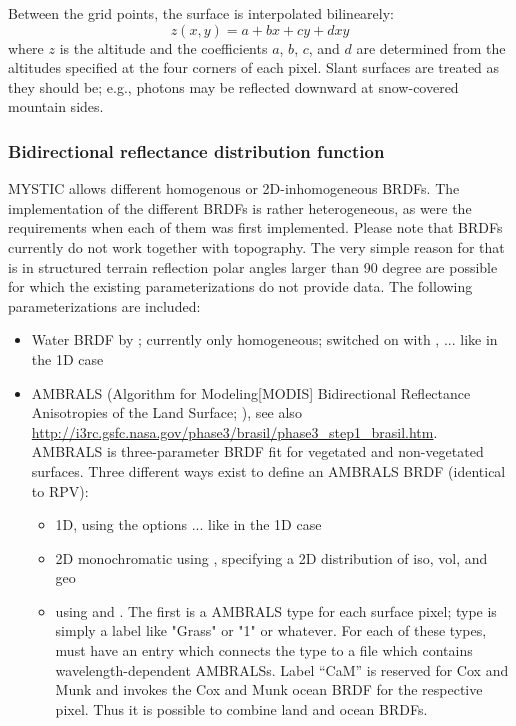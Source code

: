 {Between the grid points, the surface is interpolated 
bilinearely: 
\begin{equation}
  z(x,y) = a + bx + cy + dxy
\end{equation}
where $z$ is the altitude and the coefficients $a$, $b$, $c$, and $d$
are determined from 
the altitudes specified at the four corners of each pixel.
Slant surfaces are treated as they should be; e.g., photons
may be reflected downward at snow-covered mountain sides.

\subsubsection{Bidirectional reflectance distribution function}
MYSTIC allows different homogenous or 2D-inhomogeneous BRDFs. The 
implementation of the different BRDFs is rather heterogeneous,   
as were the requirements when each of them was first implemented.
Please note that BRDFs currently do not work together with topography. The 
very simple reason for that is in structured terrain reflection 
polar angles larger than 90 degree are possible for which the 
existing parameterizations do not provide data. The following  
parameterizations are included:
\begin{itemize}
\item Water BRDF by \citet{cox54a,cox54b}; currently only homogeneous; switched 
  on with , ... like in the 1D case
\item AMBRALS (Algorithm for Modeling[MODIS] Bidirectional Reflectance
  Anisotropies of the Land Surface; \citet{wanner97}), see also
  \url{http://i3rc.gsfc.nasa.gov/phase3/brasil/phase3_step1_brasil.htm}.
  AMBRALS is three-parameter BRDF fit for vegetated and non-vegetated surfaces.
Three different ways exist to define an AMBRALS BRDF (identical to RPV):
  \begin{itemize}
  \item 1D, using the options  ... like in the 1D case
  \item 2D monochromatic using , specifying a
    2D distribution of iso, vol, and geo
  \item using  and .
    The first is a AMBRALS
    type for each surface pixel; type is simply a label like 
    "Grass" or "1" or whatever. For each of these types,
     must have an entry which connects the type to
    a file which contains wavelength-dependent AMBRALSs. Label ``CaM''
    is reserved for Cox and Munk  
    and invokes the Cox and Munk ocean BRDF for the respective pixel. Thus
    it is possible to combine land and ocean BRDFs.
  \end{itemize}
\


\end{itemize}}
